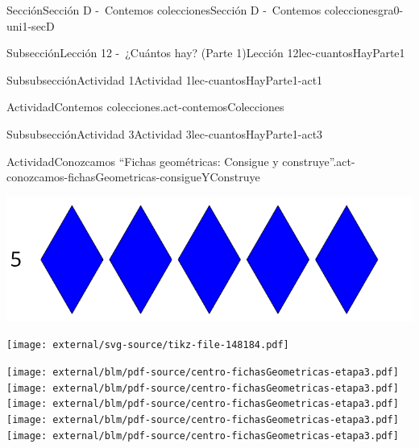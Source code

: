 \begin{sectionptx}{Sección}{Sección D -~Contemos colecciones}{}{Sección D -~Contemos colecciones}{}{}{gra0-uni1-secD}
\begin{subsectionptx}{Subsección}{Lección 12 -~¿Cuántos hay? (Parte 1)}{}{Lección 12}{}{}{lec-cuantosHayParte1}
\begin{subsubsectionptx}{Subsubsección}{Actividad 1}{}{Actividad 1}{}{}{lec-cuantosHayParte1-act1}
\begin{activity}{Actividad}{Contemos colecciones.}{act-contemosColecciones}
\begin{cutoutpage}
\end{cutoutpage}
\end{activity}%
\end{subsubsectionptx}
%
%
\typeout{************************************************}
\typeout{************************************************}
%
\begin{subsubsectionptx}{Subsubsección}{Actividad 3}{}{Actividad 3}{}{}{lec-cuantosHayParte1-act3}
\begin{activity}{Actividad}{Conozcamos “Fichas geométricas: Consigue y construye”.}{act-conozcamos-fichasGeometricas-consigueYConstruye}%
\begin{image}{0}{1}{0}{}%
\includegraphics[width=\linewidth]{external/svg-source/tikz-file-148183.pdf}
\end{image}%
\begin{image}{0}{1}{0}{}%
\texttt{[image: external/svg-source/tikz-file-148184.pdf]}
\end{image}%
\begin{cutoutpage}
\texttt{[image: external/blm/pdf-source/centro-fichasGeometricas-etapa3.pdf]}
\clearpage
\texttt{[image: external/blm/pdf-source/centro-fichasGeometricas-etapa3.pdf]}
\clearpage
\texttt{[image: external/blm/pdf-source/centro-fichasGeometricas-etapa3.pdf]}
\clearpage
\texttt{[image: external/blm/pdf-source/centro-fichasGeometricas-etapa3.pdf]}
\clearpage
\texttt{[image: external/blm/pdf-source/centro-fichasGeometricas-etapa3.pdf]}

\end{cutoutpage}
\end{activity}
\end{subsubsectionptx}
\end{subsectionptx}
\end{sectionptx}
